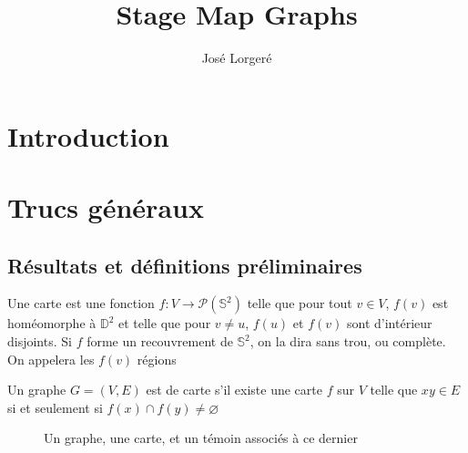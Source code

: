 \documentclass{scrartcl}
\begin{document}
\title{Stage Map Graphs}

\author{José Lorgeré}

\maketitle

\begin{flushleft}

\section*{Introduction}

\section{Trucs généraux}

\subsection{Résultats et définitions préliminaires}

\begin{def*}[Carte]
    Une carte est une fonction $f : V \rightarrow \mathcal{P}(\mathbb{S}^2)$ telle que pour tout $v \in V$, $f(v)$
    est homéomorphe à $\mathbb{D}^2$ et telle que pour $v \neq u$, $f(u)$ et $f(v)$ sont d'intérieur disjoints. Si
    $f$ forme un recouvrement de $\mathbb{S}^2$, on la dira sans trou, ou complète. On appelera les $f(v)$ régions
\end{def*}

\begin{def*}
    Un graphe $G = (V, E)$ est de carte s'il existe une carte $f$ sur $V$ telle que $xy \in E$ si et seulement si
    $f(x) \cap f(y) \neq \varnothing$
\end{def*}

\begin{figure}[h]
    \caption{Un graphe, une carte, et un témoin associés à ce dernier}

    \begin{center}
\end{center}
\end{figure}
\end{flushleft}
\end{document}
